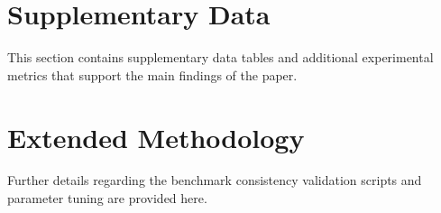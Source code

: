 \appendix
\section{Supplementary Data}
This section contains supplementary data tables and additional experimental metrics that support the main findings of the paper.

\section{Extended Methodology}
Further details regarding the benchmark consistency validation scripts and parameter tuning are provided here.
